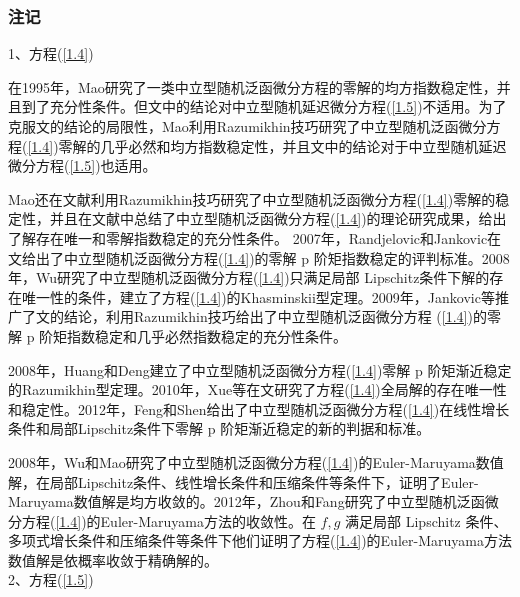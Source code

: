         \subsubsection{注记}
            1、方程(\ref{1.4})
            \par
            在1995年，Mao\cite{1995.Mao}研究了一类中立型随机泛函微分方程的零解的均方指数稳定性，并且到了充分性条件。但文\cite{1995.Mao}中的结论对中立型随机延迟微分方程(\ref{1.5})不适用。为了克服文\cite{1995.Mao}的结论的局限性，Mao\cite{1997.Mao}利用Razumikhin技巧研究了中立型随机泛函微分方程(\ref{1.4})零解的几乎必然和均方指数稳定性，并且文\cite{1997.Mao}中的结论对于中立型随机延迟微分方程(\ref{1.5})也适用。
            \par
            Mao还在文献\cite{1997.Mao2}利用Razumikhin技巧研究了中立型随机泛函微分方程(\ref{1.4})零解的稳定性，并且在文献\cite{1997.Mao3}中总结了中立型随机泛函微分方程(\ref{1.4})的理论研究成果，给出了解存在唯一和零解指数稳定的充分性条件。
            2007年，Randjelovic和Jankovic在文\cite{2007.Randjelovic}给出了中立型随机泛函微分方程(\ref{1.4})的零解 p 阶矩指数稳定的评判标准。2008 年，Wu\cite{2008.Wu}研究了中立型随机泛函微分方程(\ref{1.4})只满足局部
            Lipschitz条件下解的存在唯一性的条件，建立了方程(\ref{1.4})的Khasminskii型定理。2009年，Jankovic\cite{2009.Jankovic}等推广了文\cite{1997.Mao}的结论，利用Razumikhin技巧给出了中立型随机泛函微分方程
            (\ref{1.4})的零解 p 阶矩指数稳定和几乎必然指数稳定的充分性条件。
            \par
            2008年，Huang和Deng\cite{2008.Huang}建立了中立型随机泛函微分方程(\ref{1.4})零解 p 阶矩渐近稳定的Razumikhin型定理。2010年，Xue等在文\cite{2010.Xue}研究了方程(\ref{1.4})全局解的存在唯一性和稳定性。2012年，Feng和Shen\cite{2012.Feng}给出了中立型随机泛函微分方程(\ref{1.4})在线性增长条件和局部Lipschitz条件下零解 p 阶矩渐近稳定的新的判据和标准。
            \par
            2008年，Wu和Mao\cite{2008.Wu}研究了中立型随机泛函微分方程(\ref{1.4})的Euler-Maruyama数值解，在局部Lipschitz条件、线性增长条件和压缩条件等条件下，证明了Euler-Maruyama数值解是均方收敛的。2012年，Zhou和Fang\cite{2012.Zhou}研究了中立型随机泛函微分方程(\ref{1.4})的Euler-Maruyama方法的收敛性。在 $f,g$ 满足局部 Lipschitz 条件、多项式增长条件和压缩条件等条件下他们证明了方程(\ref{1.4})的Euler-Maruyama方法数值解是依概率收敛于精确解的。\\
            2、方程(\ref{1.5})
            \par
